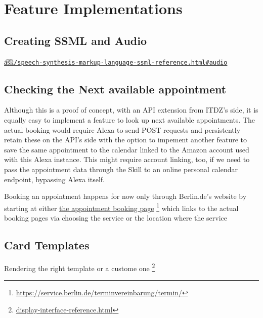\section[Features]{Feature Implementations}


\subsection{Creating SSML and Audio}


\href{https://developer.amazon.com/docs/custom-skills/speech-synthesis-markup-language-ssml-reference.html#audio}{\t{a\t{sk}}\lstinline|/speech-synthesis-markup-language-ssml-reference.html#audio|}



\subsection{Checking the Next available appointment}

Although this is a proof of concept, with an API extension from ITDZ's side, it is equally easy to implement a feature to look up next available appointments.
The actual booking would require Alexa to send POST requests and persistently retain these on the API's side with the option to impement another feature to save the same appointment to the calendar linked to the Amazon account used with this Alexa instance. This might require account linking, too, if we need to pass the appointment data through the Skill to an online personal calendar endpoint, bypassing Alexa itself.

Booking an appointment happens for now only through Berlin.de's website by starting at either \href{https://service.berlin.de/terminvereinbarung/termin/}{the appointment booking page} \footnote{\url{https://service.berlin.de/terminvereinbarung/termin/}} which links to the actual booking pages via choosing the service or the location where the service 



\subsection{Card Templates}

Rendering the right template or a custome one \footnote{\href{https://developer.amazon.com/docs/custom-skills/display-interface-reference.html}{display-interface-reference.html}}






